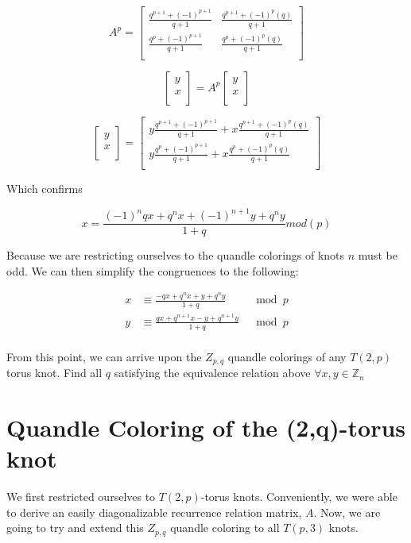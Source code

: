 \documentclass[paper.tex]{subfiles}
\begin{document}
\[
A^{p}=
\left[ \begin{array}{ccc}
\frac{q^{p+1} + (-1)^{p+1}}{q+1} & \frac{q^{p+1} + (-1)^{p}(q)}{q+1} \\
\frac{q^{p} + (-1)^{p+1}}{q+1} & \frac{q^{p} + (-1)^{p}(q)}{q+1} \\
\end{array} \right]
\]

\[
\left[ \begin{array}{ccc}
y \\
x \\
\end{array} \right]=
A^{p}
\left[ \begin{array}{ccc}
y \\
x \\
\end{array} \right]
\]

\[
\left[ \begin{array}{ccc}
y \\
x \\
\end{array} \right]=
\left[ \begin{array}{ccc}
y \frac{q^{p+1} + (-1)^{p+1}}{q+1} + x \frac{q^{p+1} + (-1)^{p}(q)}{q+1} \\
y \frac{q^{p} + (-1)^{p+1}}{q+1} + x \frac{q^{p} + (-1)^{p}(q)}{q+1} \\
\end{array} \right]
\]

Which confirms

$$x = \frac{(-1)^nqx+q^nx+(-1)^{n+1}y+q^ny}{1+q}mod(p) $$

Because we are restricting ourselves to the quandle colorings of knots $n$ must be odd. We can then simplify the congruences to the following:

\begin{align*}
	x &\equiv \frac{-qx+q^nx+y+q^ny}{1+q} & \mod{p} \\
	y &\equiv \frac{qx+q^{n+1}x-y+q^{n+1}y}{1+q} & \mod{p} \\
\end{align*}

From this point, we can arrive upon the $Z_{p,q}$ quandle colorings of any $T(2, p)$ torus knot. Find all $q$  satisfying the equivalence relation above $\forall x,y \in \mathbb{Z}_n$

\section{Quandle Coloring of the (2,q)-torus knot}\label{sec:2ntorus}
We first restricted ourselves to $T(2,p)$-torus knots. Conveniently, we were able to derive an easily diagonalizable recurrence relation matrix, $A$. Now, we are going to try and extend this $Z_{p,q}$ quandle coloring to all $T(p,3)$ knots. 
\end{document}
